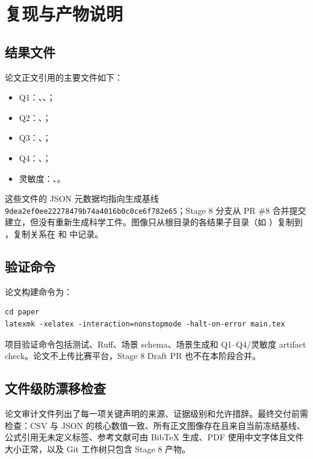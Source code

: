 \section{复现与产物说明}

\subsection{结果文件}

论文正文引用的主要文件如下：

\begin{itemize}
  \item Q1：、、；
  \item Q2：、；
  \item Q3：、；
  \item Q4：、；
  \item 灵敏度：、。
\end{itemize}

这些文件的 JSON 元数据均指向生成基线 \texttt{9dea2ef0ee22278479b74a4016b0c0ce6f782e65}；Stage 8 分支从 PR \#8 合并提交建立，但没有重新生成科学工件。图像只从根目录的各结果子目录（如 ）复制到 ，复制关系在  和  中记录。

\subsection{验证命令}

论文构建命令为：

\begin{lstlisting}[language={[LaTeX]TeX}]
cd paper
latexmk -xelatex -interaction=nonstopmode -halt-on-error main.tex
\end{lstlisting}

项目验证命令包括测试、Ruff、场景 schema、场景生成和 Q1--Q4/灵敏度 artifact check。论文不上传比赛平台，Stage 8 Draft PR 也不在本阶段合并。

\subsection{文件级防漂移检查}

论文审计文件列出了每一项关键声明的来源、证据级别和允许措辞。最终交付前需检查：CSV 与 JSON 的核心数值一致、所有正文图像存在且来自当前冻结基线、公式引用无未定义标签、参考文献可由 BibTeX 生成、PDF 使用中文字体且文件大小正常，以及 Git 工作树只包含 Stage 8 产物。
